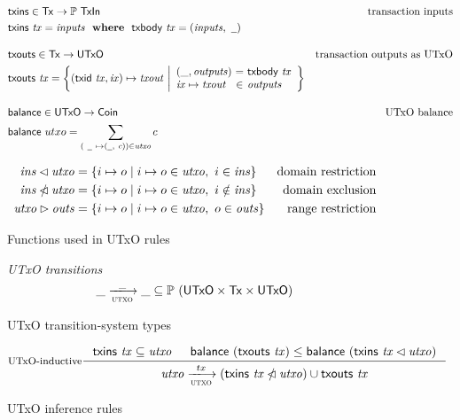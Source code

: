 \documentclass[11pt,a4paper]{article}
\newcommand{\powerset}[1]{\mathbb{P}~#1}
\newcommand{\restrictdom}{\lhd}
\newcommand{\subtractdom}{\mathbin{\slashed{\restrictdom}}}
\newcommand{\restrictrange}{\rhd}
\newcommand{\var}[1]{\mathit{#1}}
\newcommand{\fun}[1]{\mathsf{#1}}
\newcommand{\type}[1]{\mathsf{#1}}
\newcommand{\trans}[2]{\xlongrightarrow[\textsc{#1}]{#2}}
\newcommand{\nextdef}{\\[1em]}
\newcommand{\where}{~ ~ \mathbf{where}~ ~ }
\newcommand{\Tx}{\type{Tx}}
\newcommand{\UTxO}{\type{UTxO}}
\newcommand{\Coin}{\type{Coin}}
\newcommand{\TxIn}{\type{TxIn}}
\newcommand{\txins}[1]{\fun{txins}~ \var{#1}}
\newcommand{\txouts}[1]{\fun{txouts}~ \var{#1}}
\newcommand{\balance}[1]{\fun{balance}~ \var{#1}}
\newcommand{\txbody}[1]{\fun{txbody}~ \var{#1}}
\newcommand{\wcard}[0]{\underline{\phantom{a}}}
\begin{document}
\begin{figure}
  \begin{align*}
    & \fun{txins} \in \Tx \to \powerset{\TxIn}
    & \text{transaction inputs} \\
    & \txins{tx} = \var{inputs} \where \txbody{tx} = (\var{inputs}, ~\wcard)
    \nextdef
    & \fun{txouts} \in \Tx \to \UTxO
    & \text{transaction outputs as UTxO} \\
    & \fun{txouts} ~ \var{tx} =
      \left\{ (\fun{txid} ~ \var{tx}, \var{ix}) \mapsto \var{txout} ~
      \middle| \begin{array}{l@{~}c@{~}l}
                 (\_, \var{outputs}) & = & \txbody{tx} \\
                 \var{ix} \mapsto \var{txout} & \in & \var{outputs}
               \end{array}
      \right\}
    \nextdef
    & \fun{balance} \in \UTxO \to \Coin
    & \text{UTxO balance} \\
    & \fun{balance} ~ utxo = \sum_{(~\wcard ~ \mapsto (\wcard, ~c)) \in \var{utxo}} c
  \end{align*}

  \begin{align*}
    \var{ins} \restrictdom \var{utxo}
    & = \{ i \mapsto o \mid i \mapsto o \in \var{utxo}, ~ i \in \var{ins} \}
    & \text{domain restriction}
    \\
    \var{ins} \subtractdom \var{utxo}
    & = \{ i \mapsto o \mid i \mapsto o \in \var{utxo}, ~ i \notin \var{ins} \}
    & \text{domain exclusion}
    \\
    \var{utxo} \restrictrange \var{outs}
    & = \{ i \mapsto o \mid i \mapsto o \in \var{utxo}, ~ o \in \var{outs} \}
    & \text{range restriction}
  \end{align*}
  \caption{Functions used in UTxO rules}
  \label{fig:utxo-auxiliary-ops}
\end{figure}

\begin{figure}
  \emph{UTxO transitions}
  \begin{equation*}
    \var{\_} \trans{utxo}{\_} \var{\_}
    \subseteq \powerset (\UTxO \times \Tx \times \UTxO)
  \end{equation*}
  \caption{UTxO transition-system types}
  \label{fig:utxo-ts-types}
\end{figure}

\begin{figure}
  \begin{equation}\label{eq:utxo-inductive}
    \inference[UTxO-inductive]
    { \txins{tx} \subseteq \var{utxo}
      & \balance{(\txouts{tx})} \leq \balance{(\txins{tx} \restrictdom \var{utxo})}
    }
    {\var{utxo} \trans{utxo}{tx}
      (\txins{tx} \subtractdom \var{utxo}) \cup \txouts{tx}
    }
  \end{equation}
  \caption{UTxO inference rules}
  \label{fig:state-trans-utxo}
\end{figure}
\end{document}
